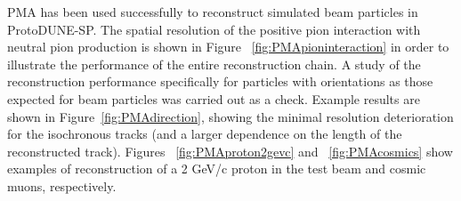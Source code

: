 PMA has been used successfully to reconstruct simulated beam particles in
ProtoDUNE-SP. The spatial resolution of the positive pion interaction with neutral pion
production is shown in Figure ~\ref{fig:PMApioninteraction} in order to illustrate the performance
of the entire reconstruction chain.
 A study of the reconstruction performance specifically for particles with orientations
as those expected for beam particles was carried out as a check.
Example results are shown in
Figure~\ref{fig:PMAdirection}, showing the minimal resolution deterioration for the isochronous
tracks (and a larger dependence on the length of the reconstructed track). Figures ~\ref{fig:PMAproton2gevc}
and ~\ref{fig:PMAcosmics} show examples of reconstruction of a 2 GeV/c proton in the test beam and
cosmic muons, respectively.




